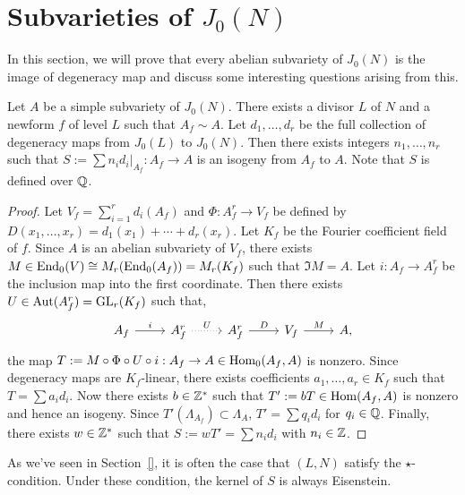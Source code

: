 \documentclass[11pt, proquest]{uwthesis}
\begin{document}
\section{Subvarieties of $J_0(N)$}%
\label{sec:subvarieties_of_j_0_n_}

In this section, we will prove that every abelian subvariety of $J_0(N)$ is the
image of degeneracy map and discuss some interesting questions arising from
this.

\begin{proposition}
    \label{prop:integral_degen}
    Let $A$ be a simple subvariety of $J_0(N)$. There exists a divisor $L$ of
    $N$ and a newform $f$ of level $L$ such that $A_f \sim A$. Let
    $d_1,\ldots,d_r$ be the full collection of degeneracy maps from $J_0(L)$ to
    $J_0(N)$. Then there exists integers $n_1,\ldots,n_r$ such that $S:=\sum
    n_i d_i|_{A_f}: A_f\to A$ is an isogeny from $A_f$ to $A$. Note that $S$ is
    defined over $\mathbb{Q}$.
\end{proposition}
\begin{proof}
    Let $V_f=\sum_{i=1} ^r d_i(A_f)$ and $\Phi:A_f ^r \to V_f$ be defined by
    $D(x_1,\ldots,x_r) = d_1(x_1)+\cdots+d_r(x_r)$. Let $K_f$ be the Fourier
    coefficient field of $f$. Since $A$ is an abelian subvariety of $V_f$, there
    exists $M\in \operatorname{End}_0(V)\cong M_r(\operatorname{End}_0(A_f)) = M_r (K_f)$ such that $\Im M
    = A$. Let $i:A_f\to A_f ^r$ be the inclusion map into the first coordinate.
    Then there exists $U\in \operatorname{Aut}(A_f ^r)=\operatorname{GL}_r (K_f)$ such that,
    \[
        \begin{tikzcd}
            A_f \arrow[r,"i"] &
            A_f ^r \arrow[r, dotted, "U"] &
            A_f ^r \arrow[r, "D"] &
            V_f \arrow[r, "M"] &
            A,
        \end{tikzcd}
    \]
    the map $T:=M \circ \Phi \circ U\circ i:A_f\to A\in \operatorname{Hom}_0(A_f, A)$ is
    nonzero. Since degeneracy maps are $K_f$-linear, there exists coefficients
    $a_1,\ldots,a_r\in K_f$ such that $T = \sum a_i d_i$. Now there exists
    $b\in \mathbb{Z}^*$ such that $T':=bT\in \operatorname{Hom}(A_f, A)$ is nonzero and hence an
    isogeny. Since $T'(\Lambda_{A_f})\subset \Lambda_A$, $T'=\sum q_i d_i$
    for $q_i\in \mathbb{Q}$. Finally, there exists $w\in \mathbb{Z}^*$ such that
    $S:=wT'=\sum n_i d_i$ with $n_i\in \mathbb{Z}$.
\end{proof}



As we've seen in Section~\ref{}, it is often the case that $(L, N)$ satisfy the
$\star$-condition. Under these condition, the kernel of $S$ is always
Eisenstein.
\end{document}
